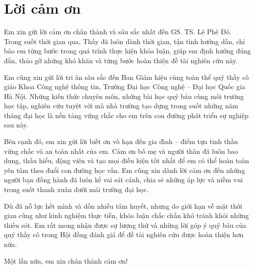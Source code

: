 
\clearpage
{}

\chapter*{Lời cảm ơn}

Em xin gửi lời cảm ơn chân thành và sâu sắc nhất đến GS. TS. Lê Phê Đô.
Trong suốt thời gian qua, Thầy đã luôn dành thời gian, tận tình hướng
dẫn, chỉ bảo em từng bước trong quá trình thực hiện khóa luận, giúp em
định hướng đúng đắn, tháo gỡ những khó khăn và từng bước hoàn thiện đề
tài nghiên cứu này.

Em cũng xin gửi lời tri ân sâu sắc đến Ban Giám hiệu cùng toàn thể quý
thầy cô giáo Khoa Công nghệ thông tin, Trường Đại học Công nghệ -- Đại
học Quốc gia Hà Nội. Những kiến thức chuyên môn, những bài học quý báu
cùng môi trường học tập, nghiên cứu tuyệt vời mà nhà trường tạo dựng
trong suốt những năm tháng đại học là nền tảng vững chắc cho em trên con
đường phát triển sự nghiệp sau này.

Bên cạnh đó, em xin gửi lời biết ơn vô hạn đến gia đình -- điểm tựa tinh
thần vững chắc và an toàn nhất của em. Cảm ơn bố mẹ và người thân đã
luôn bao dung, thấu hiểu, động viên và tạo mọi điều kiện tốt nhất để em
có thể hoàn toàn yên tâm theo đuổi con đường học vấn. Em cũng xin dành
lời cảm ơn đến những người bạn đồng hành đã luôn kề vai sát cánh, chia
sẻ những áp lực và niềm vui trong suốt thanh xuân dưới mái trường đại
học.

Dù đã nỗ lực hết mình và dồn nhiều tâm huyết, nhưng do giới hạn về mặt
thời gian cũng như kinh nghiệm thực tiễn, khóa luận chắc chắn khó tránh
khỏi những thiếu sót. Em rất mong nhận được sự lượng thứ và những lời
góp ý quý báu của quý thầy cô trong Hội đồng đánh giá để đề tài nghiên
cứu được hoàn thiện hơn nữa.

Một lần nữa, em xin chân thành cảm ơn!

\FloatBarrier
